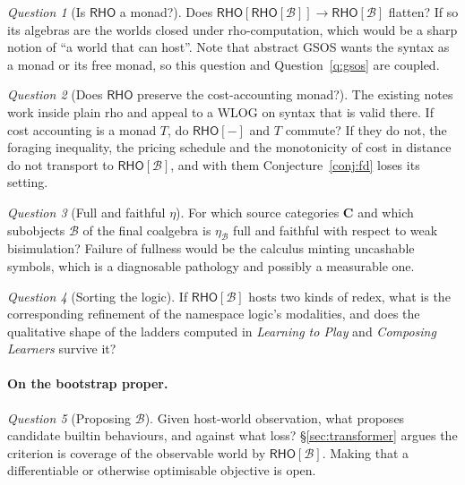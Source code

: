 \documentclass[11pt,a4paper]{article}
\theoremstyle{definition}
\theoremstyle{plain}
\theoremstyle{remark}
\newtheorem{question}{Question}
\newcommand{\rc}{\textup{rho}}
\newcommand{\RHO}{\mathsf{RHO}}
\newcommand{\Bee}{\mathcal{B}}
\newcommand{\Cat}{\mathbf{C}}
\begin{document}
\begin{question}[Is $\RHO$ a monad?]
\label{q:monad2}
Does $\RHO[\RHO[\Bee]] \to \RHO[\Bee]$ flatten? If so its algebras are the worlds closed
under \rc{}-computation, which would be a sharp notion of ``a world that can host''. Note
that abstract GSOS wants the syntax as a monad or its free monad, so this question and
Question~\ref{q:gsos} are coupled.
\end{question}

\begin{question}[Does $\RHO$ preserve the cost-accounting monad?]
\label{q:monad}
The existing notes work inside plain \rc{} and appeal to a WLOG on syntax that is valid
there. If cost accounting is a monad $T$, do $\RHO[-]$ and $T$ commute? If they do not,
the foraging inequality, the pricing schedule and the monotonicity of cost in distance do
not transport to $\RHO[\Bee]$, and with them Conjecture~\ref{conj:fd} loses its setting.
\end{question}

\begin{question}[Full and faithful $\eta$]
For which source categories $\Cat$ and which subobjects $\Bee$ of the final coalgebra is
$\eta_{\Bee}$ full and faithful with respect to weak bisimulation? Failure of fullness
would be the calculus minting uncashable symbols, which is a diagnosable pathology and
possibly a measurable one.
\end{question}

\begin{question}[Sorting the logic]
If $\RHO[\Bee]$ hosts two kinds of redex, what is the corresponding refinement of the
namespace logic's modalities, and does the qualitative shape of the ladders computed in
\emph{Learning to Play} and \emph{Composing Learners} survive it?
\end{question}

\paragraph{On the bootstrap proper.}

\begin{question}[Proposing $\Bee$]
Given host-world observation, what proposes candidate builtin behaviours, and against what
loss? \S\ref{sec:transformer} argues the criterion is coverage of the observable world by
$\RHO[\Bee]$. Making that a differentiable or otherwise optimisable objective is open.
\end{question}
\end{document}
